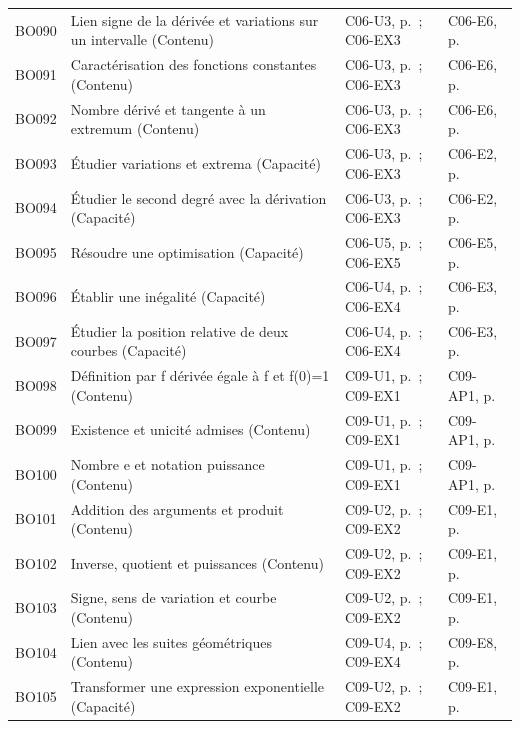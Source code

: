 \begin{longtable}{p{.1\linewidth}p{.43\linewidth}p{.19\linewidth}p{.16\linewidth}}
BO090 & Lien signe de la dérivée et variations sur un intervalle (Contenu) & C06-U3, p.\,\pageref{C06-U3} ; C06-EX3 & C06-E6, p.\,\pageref{C06-E6} \\
BO091 & Caractérisation des fonctions constantes (Contenu) & C06-U3, p.\,\pageref{C06-U3} ; C06-EX3 & C06-E6, p.\,\pageref{C06-E6} \\
BO092 & Nombre dérivé et tangente à un extremum (Contenu) & C06-U3, p.\,\pageref{C06-U3} ; C06-EX3 & C06-E6, p.\,\pageref{C06-E6} \\
BO093 & Étudier variations et extrema (Capacité) & C06-U3, p.\,\pageref{C06-U3} ; C06-EX3 & C06-E2, p.\,\pageref{C06-E2} \\
BO094 & Étudier le second degré avec la dérivation (Capacité) & C06-U3, p.\,\pageref{C06-U3} ; C06-EX3 & C06-E2, p.\,\pageref{C06-E2} \\
BO095 & Résoudre une optimisation (Capacité) & C06-U5, p.\,\pageref{C06-U5} ; C06-EX5 & C06-E5, p.\,\pageref{C06-E5} \\
BO096 & Établir une inégalité (Capacité) & C06-U4, p.\,\pageref{C06-U4} ; C06-EX4 & C06-E3, p.\,\pageref{C06-E3} \\
BO097 & Étudier la position relative de deux courbes (Capacité) & C06-U4, p.\,\pageref{C06-U4} ; C06-EX4 & C06-E3, p.\,\pageref{C06-E3} \\
BO098 & Définition par f dérivée égale à f et f(0)=1 (Contenu) & C09-U1, p.\,\pageref{C09-U1} ; C09-EX1 & C09-AP1, p.\,\pageref{C09-AP1} \\
BO099 & Existence et unicité admises (Contenu) & C09-U1, p.\,\pageref{C09-U1} ; C09-EX1 & C09-AP1, p.\,\pageref{C09-AP1} \\
BO100 & Nombre e et notation puissance (Contenu) & C09-U1, p.\,\pageref{C09-U1} ; C09-EX1 & C09-AP1, p.\,\pageref{C09-AP1} \\
BO101 & Addition des arguments et produit (Contenu) & C09-U2, p.\,\pageref{C09-U2} ; C09-EX2 & C09-E1, p.\,\pageref{C09-E1} \\
BO102 & Inverse, quotient et puissances (Contenu) & C09-U2, p.\,\pageref{C09-U2} ; C09-EX2 & C09-E1, p.\,\pageref{C09-E1} \\
BO103 & Signe, sens de variation et courbe (Contenu) & C09-U2, p.\,\pageref{C09-U2} ; C09-EX2 & C09-E1, p.\,\pageref{C09-E1} \\
BO104 & Lien avec les suites géométriques (Contenu) & C09-U4, p.\,\pageref{C09-U4} ; C09-EX4 & C09-E8, p.\,\pageref{C09-E8} \\
BO105 & Transformer une expression exponentielle (Capacité) & C09-U2, p.\,\pageref{C09-U2} ; C09-EX2 & C09-E1, p.\,\pageref{C09-E1} \\

\end{longtable}
